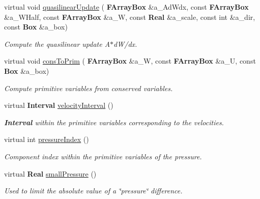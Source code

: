 \begin{DoxyCompactItemize}
\mbox{\label{class_advection_physics_ac5eff7a0d16d0cece194ccae1959d33d}} 
virtual void \hyperlink{class_advection_physics_ac5eff7a0d16d0cece194ccae1959d33d}{quasilinear\+Update} (\textbf{ F\+Array\+Box} \&a\+\_\+\+Ad\+Wdx, const \textbf{ F\+Array\+Box} \&a\+\_\+\+W\+Half, const \textbf{ F\+Array\+Box} \&a\+\_\+W, const \textbf{ Real} \&a\+\_\+scale, const int \&a\+\_\+dir, const \textbf{ Box} \&a\+\_\+box)
\begin{DoxyCompactList}\small\item\em Compute the quasilinear update A$\ast$d\+W/dx. \end{DoxyCompactList}\item 
\mbox{\label{class_advection_physics_a54c4977c33114766868740fd21429d5f}} 
virtual void \hyperlink{class_advection_physics_a54c4977c33114766868740fd21429d5f}{cons\+To\+Prim} (\textbf{ F\+Array\+Box} \&a\+\_\+W, const \textbf{ F\+Array\+Box} \&a\+\_\+U, const \textbf{ Box} \&a\+\_\+box)
\begin{DoxyCompactList}\small\item\em Compute primitive variables from conserved variables. \end{DoxyCompactList}\item 
virtual \textbf{ Interval} \hyperlink{class_advection_physics_a245ebc2c16520c7f50cc25efc1eb5a0d}{velocity\+Interval} ()
\begin{DoxyCompactList}\small\item\em \textbf{ Interval} within the primitive variables corresponding to the velocities. \end{DoxyCompactList}\item 
virtual int \hyperlink{class_advection_physics_a7b88645af918e8ae6ad2ec21eb49734f}{pressure\+Index} ()
\begin{DoxyCompactList}\small\item\em Component index within the primitive variables of the pressure. \end{DoxyCompactList}\item 
virtual \textbf{ Real} \hyperlink{class_advection_physics_ae562469a45e542ceb2195ab8f3689db2}{small\+Pressure} ()
\begin{DoxyCompactList}\small\item\em Used to limit the absolute value of a \char`\"{}pressure\char`\"{} difference. \end{DoxyCompactList}\item 

\end{DoxyCompactItemize}
